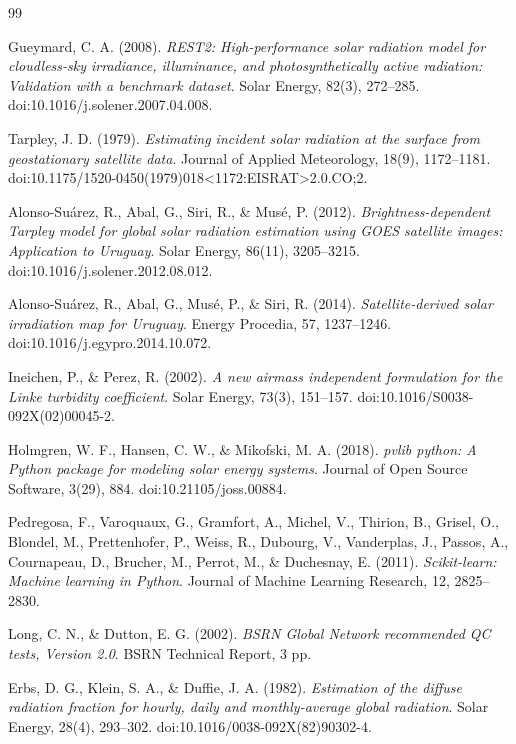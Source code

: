 \documentclass[../main.tex]{subfiles}
\begin{document}
\newpage
\begin{thebibliography}{99}

Gueymard, C. A. (2008).
\textit{REST2: High-performance solar radiation model for cloudless-sky irradiance, illuminance, and photosynthetically active radiation: Validation with a benchmark dataset}.
Solar Energy, 82(3), 272--285. doi:10.1016/j.solener.2007.04.008.

Tarpley, J. D. (1979).
\textit{Estimating incident solar radiation at the surface from geostationary satellite data}.
Journal of Applied Meteorology, 18(9), 1172--1181. doi:10.1175/1520-0450(1979)018\textless1172:EISRAT\textgreater2.0.CO;2.

Alonso-Suárez, R., Abal, G., Siri, R., \& Musé, P. (2012).
\textit{Brightness-dependent Tarpley model for global solar radiation estimation using GOES satellite images: Application to Uruguay}.
Solar Energy, 86(11), 3205--3215. doi:10.1016/j.solener.2012.08.012.

Alonso-Suárez, R., Abal, G., Musé, P., \& Siri, R. (2014).
\textit{Satellite-derived solar irradiation map for Uruguay}.
Energy Procedia, 57, 1237--1246. doi:10.1016/j.egypro.2014.10.072.

Ineichen, P., \& Perez, R. (2002).
\textit{A new airmass independent formulation for the Linke turbidity coefficient}.
Solar Energy, 73(3), 151--157. doi:10.1016/S0038-092X(02)00045-2.

Holmgren, W. F., Hansen, C. W., \& Mikofski, M. A. (2018).
\textit{pvlib python: A Python package for modeling solar energy systems}.
Journal of Open Source Software, 3(29), 884. doi:10.21105/joss.00884.

Pedregosa, F., Varoquaux, G., Gramfort, A., Michel, V., Thirion, B., Grisel, O., Blondel, M., Prettenhofer, P., Weiss, R., Dubourg, V., Vanderplas, J., Passos, A., Cournapeau, D., Brucher, M., Perrot, M., \& Duchesnay, E. (2011).
\textit{Scikit-learn: Machine learning in Python}.
Journal of Machine Learning Research, 12, 2825--2830.

Long, C. N., \& Dutton, E. G. (2002).
\textit{BSRN Global Network recommended QC tests, Version 2.0}.
BSRN Technical Report, 3 pp.

Erbs, D. G., Klein, S. A., \& Duffie, J. A. (1982).
\textit{Estimation of the diffuse radiation fraction for hourly, daily and monthly-average global radiation}.
Solar Energy, 28(4), 293--302. doi:10.1016/0038-092X(82)90302-4.


\end{thebibliography}
\end{document}
